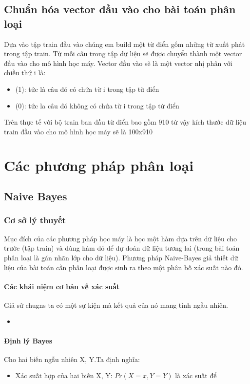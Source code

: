 \documentclass[a4paper,12pt]{report}
\begin{document}
\section{Chuẩn hóa vector đầu vào cho bài toán phân loại}
Dựa vào tập train đầu vào chúng em build một từ điển gốm những từ xuất phát trong tập train. Từ mỗi câu trong tập dữ liệu sẽ được chuyển thành một vector đầu vào cho mô hình học máy. Vector đầu vào sẽ là một vector nhị phân với chiều thứ i là: 
\begin{itemize}
\item (1): tức là câu đó có chứa từ i trong tập từ điển
\item (0): tức la câu đó không có chứa từ i trong tập từ điển
\end{itemize}

Trên thực tế với bộ train ban đầu từ điển bao gồm 910 từ vậy kích thước dữ liệu train đầu vào cho mô hình học máy sẽ là 100x910

\chapter{Các phương pháp phân loại}
\section{Naive Bayes}
\subsection{Cơ sở lý thuyết}
Mục đích của các phương pháp học máy là học một hàm dựa trên dữ liệu cho trước (tập train) và dùng hàm đó để dự đoán dữ liệu tương lai (trong bài toán phân loại là gán nhãn lớp cho dữ liệu). Phương pháp Naive-Bayes giả thiết dữ liệu của bài toán cần phân loại được sinh ra theo một phân bố xác suất nào đó. 
\subsubsection{Các khái niệm cơ bản vễ xác suất}
Giả sử chugns ta có một sự kiện mà kết quả của nó mang tính ngẫu nhiên.
\begin{itemize}
\item 
\end{itemize}
\subsubsection{Định lý Bayes}
Cho hai biến ngẫu nhiên X, Y.Ta định nghĩa:
\begin{itemize}
\item Xác suất hợp của hai biến X, Y: $Pr(X=x, Y=Y)$ là xác suất để 
\end{itemize}
\end{document}
